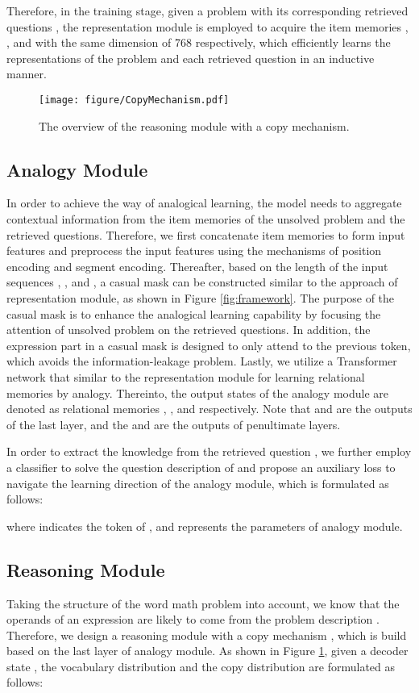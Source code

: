 \documentclass[11pt, a4paper]{article}
\begin{document}
Therefore, in the training stage, given a problem  with its corresponding retrieved questions , the representation module is employed to acquire the item memories , ,  and  with the same dimension of 768 respectively, which efficiently learns the representations of the problem and each retrieved question in an inductive manner.

\begin{figure}[t]
  \centering
  \texttt{[image: figure/CopyMechanism.pdf]}
  \caption{The overview of the reasoning module with a copy mechanism.}
  \label{fig:copymechanism}
\end{figure}

\subsection{Analogy Module}
In order to achieve the way of analogical learning, the model needs to aggregate contextual information from the item memories of the unsolved problem and the retrieved questions. Therefore, we first concatenate item memories to form input features  and preprocess the input features using the mechanisms of position encoding and segment encoding. Thereafter, based on the length of the input sequences , ,  and , a casual mask can be constructed similar to the approach of representation module, as shown in Figure \ref{fig:framework}. The purpose of the casual mask is to enhance the analogical learning capability by focusing the attention of unsolved problem on the retrieved questions. In addition, the expression part in a casual mask is designed to only attend to the previous token, which avoids the information-leakage problem. Lastly, we utilize a Transformer network that similar to the representation module for learning relational memories by analogy. Thereinto, the output states of the analogy module are denoted as relational memories , ,  and  respectively. Note that  and  are the outputs of the last layer, and the  and  are the outputs of penultimate layers.

In order to extract the knowledge from the retrieved question , we further employ a classifier  to solve the question description of  and propose an auxiliary loss  to navigate the learning direction of the analogy module, which is formulated as follows:

where  indicates the  token of , and  represents the parameters of analogy module. 


\subsection{Reasoning Module}
Taking the structure of the word math problem into account, we know that the operands of an expression are likely to come from the problem description . Therefore, we design a reasoning module with a copy mechanism \citep{see2017get}, which is build based on the last layer of analogy module. As shown in Figure \ref{fig:copymechanism}, given a decoder state , the vocabulary distribution  and the copy distribution  are formulated as follows:
\end{document}
